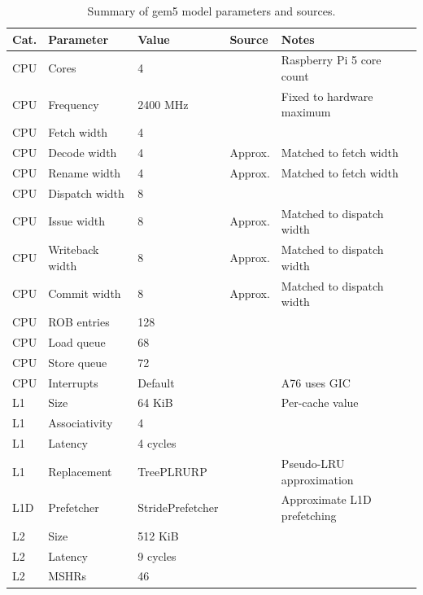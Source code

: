 \documentclass[acmlarge]{acmart}
\begin{document}
\begin{table}[htbp]
\centering
\footnotesize
\setlength{\tabcolsep}{3pt}
\renewcommand{\arraystretch}{1.08}
\caption{Summary of gem5 model parameters and sources.}
\label{tab:model_parameters}
\begin{tabularx}{\textwidth}{ll l l X}
\toprule
\textbf{Cat.} & \textbf{Parameter} & \textbf{Value} & \textbf{Source} & \textbf{Notes} \\
\midrule
CPU & Cores & 4 & \cite{RPIDocs} & Raspberry Pi 5 core count \\
CPU & Frequency & 2400 MHz & \cite{RPIDocs} & Fixed to hardware maximum \\
CPU & Fetch width & 4 & \cite{ArmCommunity} &  \\
CPU & Decode width & 4 & Approx. & Matched to fetch width \\
CPU & Rename width & 4 & Approx. & Matched to fetch width \\
CPU & Dispatch width & 8 & \cite{ArmCommunity} &  \\
CPU & Issue width & 8 & Approx. & Matched to dispatch width \\
CPU & Writeback width & 8 & Approx. & Matched to dispatch width \\
CPU & Commit width & 8 & Approx. & Matched to dispatch width \\
CPU & ROB entries & 128 & \cite{Android_Authority_2018} &  \\
CPU & Load queue & 68 & \cite{Android_Authority_2018} &  \\
CPU & Store queue & 72 & \cite{Android_Authority_2018} &  \\
CPU & Interrupts & Default & \cite{armCortexA76Product} & A76 uses GIC \\
\midrule
L1 & Size & 64 KiB & \cite{armCortexA76Product} & Per-cache value \\
L1 & Associativity & 4 & \cite{armCortexA76Product} &  \\
L1 & Latency & 4 cycles & \cite{Android_Authority_2018} &  \\
L1 & Replacement & TreePLRURP & \cite{armCortexA76Product} & Pseudo-LRU approximation \\
L1D & Prefetcher & StridePrefetcher & \cite{FetchBench,armCortexA76Product} & Approximate L1D prefetching \\
\midrule
L2 & Size & 512 KiB & \cite{armCortexA76Product} &  \\
L2 & Latency & 9 cycles & \cite{Android_Authority_2018} &  \\
L2 & MSHRs & 46 & \cite{A76G76} &  \\

\end{tabularx}
\end{table}
\end{document}
